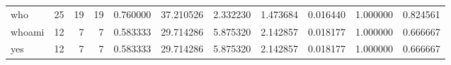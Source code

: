 \begin{longtable}{lrrrrrrrrrr}
who       &                                      25 &                 19 &                                19 &                                   0.760000 &                              37.210526 &                                     2.332230 &                          1.473684 &                                0.016440 &                           1.000000 &                                           0.824561 \\
whoami    &                                      12 &                  7 &                                 7 &                                   0.583333 &                              29.714286 &                                     5.875320 &                          2.142857 &                                0.018177 &                           1.000000 &                                           0.666667 \\
yes       &                                      12 &                  7 &                                 7 &                                   0.583333 &                              29.714286 &                                     5.875320 &                          2.142857 &                                0.018177 &                           1.000000 &                                           0.666667 \\
\end{longtable}
